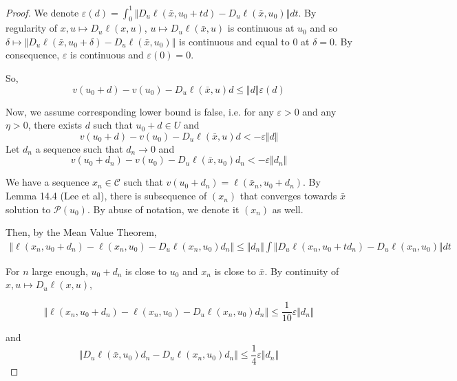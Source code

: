 \begin{proof}
   We denote $\varepsilon(d)= \int_0^1 \Vert D_u\ell(\bar x, u_0 +td) - D_u\ell(\bar x, u_0)\Vert dt$. By regularity of $x, u \mapsto D_u\ell(x, u)$, $u \mapsto D_u\ell(\bar x, u)$ is continuous at $u_0$ and so $ \delta \mapsto \Vert D_u\ell(\bar x, u_0 + \delta) -D_u\ell(\bar x, u_0)\Vert$ is continuous and equal to $0$ at $\delta=0$. By consequence, $\varepsilon$ is continuous and $\varepsilon(0)=0$.

   So,
   \begin{equation}
       v(u_0+d) - v(u_0) - D_u\ell(\bar x, u)d \leq \Vert d\Vert \varepsilon(d)
   \end{equation}

    Now, we assume corresponding lower bound is false, i.e. for any $\varepsilon>0$ and any $\eta >0$, there exists $d$ such that $u_0 + d\in U$ and
   \begin{equation}
       v(u_0+d) - v(u_0) - D_u\ell(\bar x, u)d < -\varepsilon\Vert d\Vert
   \end{equation}
    Let $d_n$ a sequence such that $d_n \to 0$ and
   \begin{equation}\label{eq:proof_hyp}
       v(u_0+d_n) - v(u_0) - D_u\ell(\bar x, u_0)d_n < -\varepsilon\Vert d_n\Vert
   \end{equation}

   We have a sequence $x_n\in \mathcal C$ such that $v(u_0+ d_n) = \ell(\bar x_n, u_0 + d_n)$. By Lemma 14.4 (Lee et al), there is subsequence of $(x_n)$ that converges towards $\bar x$ solution to $\mathcal P(u_0)$. By abuse of notation, we denote it $(x_n)$ as well.

   Then, by the Mean Value Theorem,
   \begin{align}
       \Vert \ell(x_n, u_0 + d_n) - \ell(x_n, u_0) - D_u \ell(x_n, u_0)d_n\Vert \leq \Vert d_n\Vert \int \Vert D_u \ell(x_n, u_0 + td_n) - D_u \ell(x_n, u_0)\Vert dt
   \end{align}

   For $n$ large enough, $u_0 + d_n$ is close to $u_0$ and $x_n$ is close to $\bar x$. By continuity of $x, u \mapsto D_u\ell(x, u)$,

   \begin{equation}
       \Vert \ell(x_n, u_0 + d_n) - \ell(x_n, u_0) - D_u \ell(x_n, u_0)d_n\Vert \leq \frac{1}{10} \varepsilon \Vert d_n \Vert
   \end{equation}

    and
    \begin{equation}
        \Vert D_u \ell(\bar x, u_0)d_n - D_u \ell(x_n, u_0)d_n\Vert \leq \frac{1}{4}\varepsilon \Vert d_n \Vert
    \end{equation}


\end{proof}
